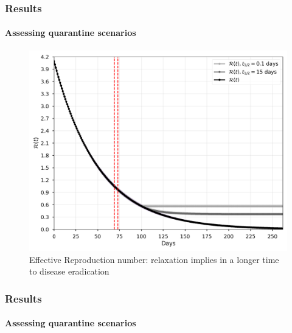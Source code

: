 \documentclass{beamer}
\begin{document}
\begin{frame}
\frametitle{Results} 
\framesubtitle{Assessing quarantine scenarios} 

	\begin{figure}
		\centering
		\caption*{Effective Reproduction number: relaxation implies in a longer time to disease eradication}
		\includegraphics[scale=0.31]{figs/Rt_prediction_bayes_all.png}
	\end{figure}

\end{frame}

\begin{frame}
\frametitle{Results} 
\framesubtitle{Assessing quarantine scenarios}

\end{frame}
\end{document}
